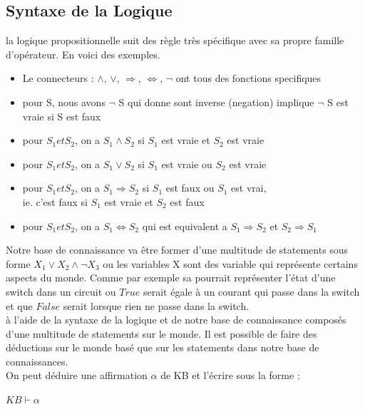\documentclass[oneside]{book}
\begin{document}
\subsection{Syntaxe de la Logique}
la logique propositionnelle suit des règle très spécifique avec sa propre famille d'opérateur. En voici des exemples.\\

\begin{itemize}


\item Le connecteurs : $\wedge$,
$\vee$,
$\Rightarrow$,
$\Leftrightarrow$,
$\neg$ ont tous des fonctions specifiques 
\item pour S, nous avons $\neg$ S qui donne sont inverse (negation) implique $\neg$ S est vraie si S est faux
\item pour $S_1 et S_2$, on a $S_1 \wedge S_2$ si $S_1$ est vraie et $S_2$ est vraie
\item pour $S_1 et S_2$, on a $S_1 \vee S_2$ si $S_1$ est vraie ou $S_2$ est vraie
\item pour $S_1 et S_2$, on a $S_1 \Rightarrow S_2$ si $S_1$ est faux ou $S_1$ est vrai, \\
ie. c'est faux si $S_1$ est vraie et $S_2$ est faux
\item pour $S_1 et S_2$, on a $S_1 \Leftrightarrow S_2$ qui est equivalent a $S_1 \Rightarrow S_2$ et $S_2 \Rightarrow S_1$ 

\end{itemize}

Notre base de connaissance va être former d'une multitude de statements sous forme $X_1 \vee X_2 \wedge \neg X_3$ ou les variables X sont des variable qui représente certains aspects du monde. Comme par exemple sa pourrait représenter l'état d'une switch dans un circuit ou $True$ serait égale à un courant qui passe dans la switch et que $False$ serait lorsque rien ne passe dans la switch.\\


à l'aide de la syntaxe de la logique et de notre base de connaissance composés d'une multitude  de statements sur le monde. Il est possible de faire des déductions sur le monde basé que sur les statements dans notre base de connaissances.\\

On peut déduire une affirmation $\alpha$ de KB et l'écrire sous la forme : \\
\begin{center}
$ KB \vdash \alpha$
\end{center}
\end{document}
